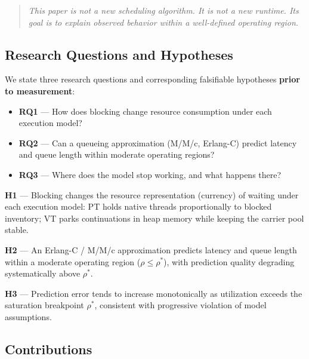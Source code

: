 \documentclass[10pt]{article}
\begin{document}
\begin{quote}
\itshape This paper is not a new scheduling algorithm. It is not a new runtime. Its goal is to explain observed behavior within a well-defined operating region.
\end{quote}

\subsection{Research Questions and Hypotheses}

We state three research questions and corresponding falsifiable hypotheses \textbf{prior to measurement}:

\begin{itemize}
\item \textbf{RQ1} --- How does blocking change resource consumption under each execution model?
\item \textbf{RQ2} --- Can a queueing approximation (M/M/c, Erlang-C) predict latency and queue length within moderate operating regions?
\item \textbf{RQ3} --- Where does the model stop working, and what happens there?
\end{itemize}

\textbf{H1} --- Blocking changes the resource representation (currency) of waiting under each execution model: PT holds native threads proportionally to blocked inventory; VT parks continuations in heap memory while keeping the carrier pool stable.

\textbf{H2} --- An Erlang-C / M/M/c approximation predicts latency and queue length within a moderate operating region ($\rho \leq \rho^*$), with prediction quality degrading systematically above $\rho^*$.

\textbf{H3} --- Prediction error tends to increase monotonically as utilization exceeds the saturation breakpoint $\rho^*$, consistent with progressive violation of model assumptions.

\subsection{Contributions}
\end{document}
